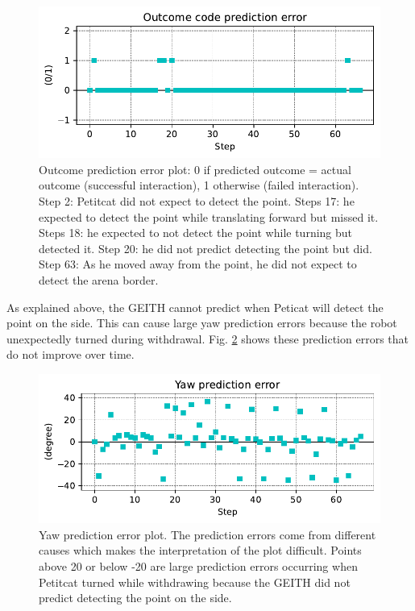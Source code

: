 \documentclass[runningheads]{llncs}
\begin{document}
\begin{figure}
	\includegraphics[width=\textwidth]{01_Outcome_code.pdf}
	\caption{Outcome prediction error plot: 0 if predicted outcome = actual outcome (successful interaction), 1 otherwise (failed interaction).
	Step 2: Petitcat did not expect to detect the point.
	Steps 17: he expected to detect the point while translating forward but missed it.
	Steps 18: he expected to not detect the point while turning but detected it.
	Step 20: he did not predict detecting the point but did. 
	Step 63: As he moved away from the point, he did not expect to detect the arena border. } \label{fig:outcome}
\end{figure}

As explained above, the GEITH cannot predict when Peticat will detect the point on the side. 
This can cause large yaw prediction errors because the robot unexpectedly turned during withdrawal.
Fig. \ref{fig:yaw_pe} shows these prediction errors that do not improve over time. 

\begin{figure}
	\includegraphics[width=\textwidth]{02_yaw_pe.pdf}
	\caption{Yaw prediction error plot. The prediction errors come from different causes which makes the interpretation of the plot difficult. 
		Points above 20 or below -20 are large prediction errors occurring when Petitcat turned while withdrawing because the GEITH did not predict detecting the point on the side.
	} \label{fig:yaw_pe}
\end{figure}
\end{document}
